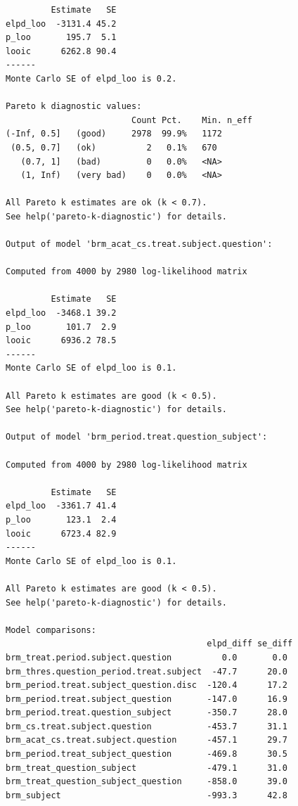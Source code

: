 \documentclass[
  12pt,
  a4paper,
  extrafontsizes,
  onecolumn,
  openright]{memoir}
\makeatletter
\newcommand{\MemoirChapStyle}{daleif1}
\newcommand{\MemoirPageStyle}{Ruled}
\newlength\widthw %
\newcommand*{\SmallMargins}{
  \setlrmarginsandblock{1.5in}{1.5in}{*}
  \setmarginnotes{0.1in}{0.1in}{0.1in}
  \setulmarginsandblock{1.5in}{1in}{*}
  \checkandfixthelayout
  \ch@ngetext
  \clearpage
  \setlength{\widthw}{\textwidth+\marginparsep+\marginparwidth}
  \footnotesatfoot
  \chapterstyle{\MemoirChapStyle}  %
  \pagestyle{\MemoirPageStyle}
}
\makeatother
\begin{document}
\begin{verbatim}
         Estimate   SE
elpd_loo  -3131.4 45.2
p_loo       195.7  5.1
looic      6262.8 90.4
------
Monte Carlo SE of elpd_loo is 0.2.

Pareto k diagnostic values:
                         Count Pct.    Min. n_eff
(-Inf, 0.5]   (good)     2978  99.9%   1172      
 (0.5, 0.7]   (ok)          2   0.1%   670       
   (0.7, 1]   (bad)         0   0.0%   <NA>      
   (1, Inf)   (very bad)    0   0.0%   <NA>      

All Pareto k estimates are ok (k < 0.7).
See help('pareto-k-diagnostic') for details.

Output of model 'brm_acat_cs.treat.subject.question':

Computed from 4000 by 2980 log-likelihood matrix

         Estimate   SE
elpd_loo  -3468.1 39.2
p_loo       101.7  2.9
looic      6936.2 78.5
------
Monte Carlo SE of elpd_loo is 0.1.

All Pareto k estimates are good (k < 0.5).
See help('pareto-k-diagnostic') for details.

Output of model 'brm_period.treat.question_subject':

Computed from 4000 by 2980 log-likelihood matrix

         Estimate   SE
elpd_loo  -3361.7 41.4
p_loo       123.1  2.4
looic      6723.4 82.9
------
Monte Carlo SE of elpd_loo is 0.1.

All Pareto k estimates are good (k < 0.5).
See help('pareto-k-diagnostic') for details.

Model comparisons:
                                        elpd_diff se_diff
brm_treat.period.subject.question          0.0       0.0 
brm_thres.question_period.treat.subject  -47.7      20.0 
brm_period.treat.subject_question.disc  -120.4      17.2 
brm_period.treat.subject_question       -147.0      16.9 
brm_period.treat.question_subject       -350.7      28.0 
brm_cs.treat.subject.question           -453.7      31.1 
brm_acat_cs.treat.subject.question      -457.1      29.7 
brm_period.treat_subject_question       -469.8      30.5 
brm_treat_question_subject              -479.1      31.0 
brm_treat_question_subject_question     -858.0      39.0 
brm_subject                             -993.3      42.8 
\end{verbatim}

\normalsize


\backmatter

\SmallMargins
\end{document}
